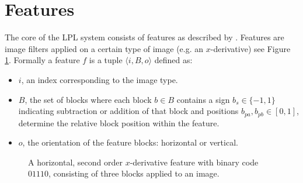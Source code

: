 \documentclass[a4paper,11pt]{article}
\begin{document}
\section{Features} \label{sec:feat}
The core of the LPL system consists of features as described by
\cite{dlagnekov_thesis, zhang,naturaltext}. Features are image filters applied
on a certain type of image (e.g. an $x$-derivative) see Figure \ref{fig:feature}.
Formally a feature $f$ is a tuple $\langle i, B, o \rangle$ defined as:
\begin{itemize}
	\item{$i$, an index corresponding to the image type.}
	\item{$B$, the set of blocks where each block $b \in B$ contains a sign
	$b_s \in \{-1,1\}$ indicating subtraction or addition of that block and
	positions $b_{pa},b_{pb} \in [0,1]$, determine the relative block position
	within the feature.}
	\item{$o$, the orientation of the feature blocks: horizontal or vertical.}
\end{itemize}
\begin{figure}[!ht]
\centering
{}
\caption{A horizontal, second order $x$-derivative feature with binary code
$01110$, consisting of three blocks applied to an image.}
\label{fig:feature}
\end{figure}
\end{document}
